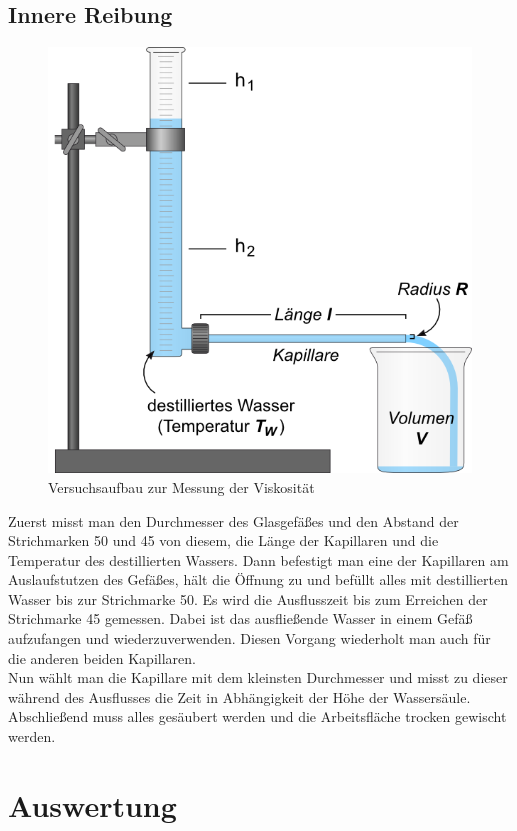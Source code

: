\documentclass[12pt,a4paper,titlepage,headinclude,bibtotoc]{scrartcl}
\begin{document}
\subsection{Innere Reibung}
\begin{figure}[!htb]
	\centering
	\includegraphics[scale=0.7]{ViskoAufbau.png}
	\caption{Versuchsaufbau zur Messung der Viskosität \cite{lp}}
	\label{fig:Visko}
\end{figure}
Zuerst misst man den Durchmesser des Glasgefäßes und den Abstand der Strichmarken 50 und 45 von diesem, die Länge der Kapillaren und die Temperatur des destillierten Wassers.
Dann befestigt man eine der Kapillaren am Auslaufstutzen des Gefäßes, hält die Öffnung zu und befüllt alles mit destillierten Wasser bis zur Strichmarke 50.
Es wird die Ausflusszeit bis zum Erreichen der Strichmarke 45 gemessen.
Dabei ist das ausfließende Wasser in einem Gefäß aufzufangen und wiederzuverwenden.
Diesen Vorgang wiederholt man auch für die anderen beiden Kapillaren.\\
Nun wählt man die Kapillare mit dem kleinsten Durchmesser und misst zu dieser während des Ausflusses die Zeit in Abhängigkeit der Höhe der Wassersäule.\\
Abschließend muss alles gesäubert werden und die Arbeitsfläche trocken gewischt werden.

\section{Auswertung}
\label{sec:auswertung}
\end{document}
